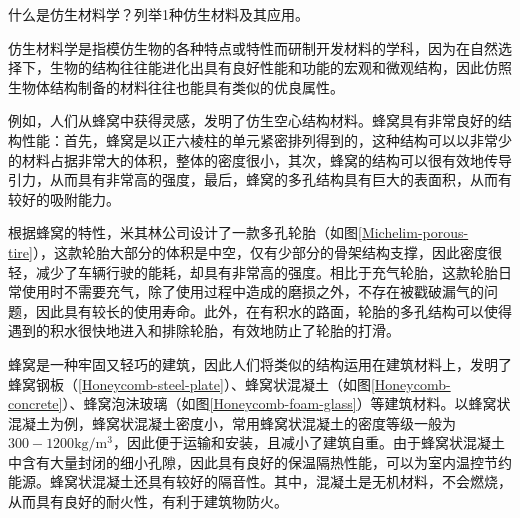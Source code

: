 \documentclass{assignment}
\begin{document}
\begin{ti}
    什么是仿生材料学？列举1种仿生材料及其应用。
\end{ti}
\begin{da}
    仿生材料学是指模仿生物的各种特点或特性而研制开发材料的学科，因为在自然选择下，生物的结构往往能进化出具有良好性能和功能的宏观和微观结构，因此仿照生物体结构制备的材料往往也能具有类似的优良属性。

    例如，人们从蜂窝中获得灵感，发明了仿生空心结构材料。蜂窝具有非常良好的结构性能：首先，蜂窝是以正六棱柱的单元紧密排列得到的，这种结构可以以非常少的材料占据非常大的体积，整体的密度很小，其次，蜂窝的结构可以很有效地传导引力，从而具有非常高的强度，最后，蜂窝的多孔结构具有巨大的表面积，从而有较好的吸附能力。

    根据蜂窝的特性，米其林公司设计了一款多孔轮胎（如图\ref{Michelim-porous-tire}），这款轮胎大部分的体积是中空，仅有少部分的骨架结构支撑，因此密度很轻，减少了车辆行驶的能耗，却具有非常高的强度。相比于充气轮胎，这款轮胎日常使用时不需要充气，除了使用过程中造成的磨损之外，不存在被戳破漏气的问题，因此具有较长的使用寿命。此外，在有积水的路面，轮胎的多孔结构可以使得遇到的积水很快地进入和排除轮胎，有效地防止了轮胎的打滑。

    蜂窝是一种牢固又轻巧的建筑，因此人们将类似的结构运用在建筑材料上，发明了蜂窝钢板（\ref{Honeycomb-steel-plate}）、蜂窝状混凝土（如图\ref{Honeycomb-concrete}）、蜂窝泡沫玻璃（如图\ref{Honeycomb-foam-glass}）等建筑材料。以蜂窝状混凝土为例，蜂窝状混凝土密度小，常用蜂窝状混凝土的密度等级一般为$300-1200\mathrm{kg}/\mathrm{m}^3$，因此便于运输和安装，且减小了建筑自重。由于蜂窝状混凝土中含有大量封闭的细小孔隙，因此具有良好的保温隔热性能，可以为室内温控节约能源。蜂窝状混凝土还具有较好的隔音性。其中，混凝土是无机材料，不会燃烧，从而具有良好的耐火性，有利于建筑物防火。


\end{da}
\end{document}
